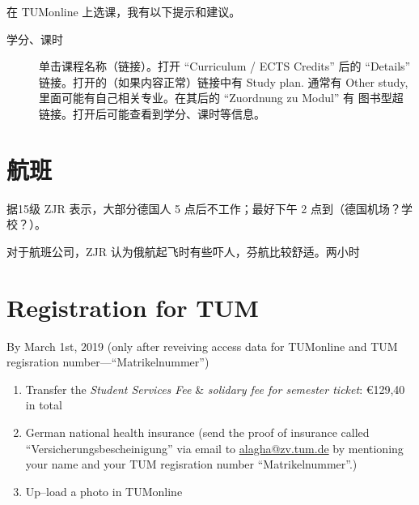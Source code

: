 \documentclass[oneside,final]{book}
\begin{document}
在 TUMonline 上选课，我有以下提示和建议。
\begin{description}
\item[学分、课时] 单击课程名称（链接）。打开 ``Curriculum /
ECTS Credits'' 后的 ``Details'' 链接。打开的（如果内容正常）链接中有 Study plan. 通常有 Other study, 里面可能有自己相关专业。在其后的 ``Zuordnung zu Modul'' 有
图书型超链接。打开后可能查看到学分、课时等信息。
\end{description}

\chapter{航班}
据15级 ZJR 表示，大部分德国人 5 点后不工作；最好下午 2 点到（德国机场？学校？）。

对于航班公司，ZJR 认为俄航起飞时有些吓人，芬航比较舒适。两小时

\chapter{Registration for TUM}
By March 1st, 2019 (only after reveiving access data for TUMonline and TUM regisration number---``Matrikelnummer'')
\begin{enumerate}
\item Transfer the \emph{Student Services Fee} \& \emph{solidary fee for semester ticket}: \euro{129,40} in total
\item German national health insurance (send the proof of insurance called ``Versicherungsbescheinigung'' via email to \href{mailto:alagha@zv.tum.de}{alagha@zv.tum.de} by mentioning your name and your TUM regisration number ``Matrikelnummer''.)
\item Up--load a photo in TUMonline
\end{enumerate}
\end{document}
